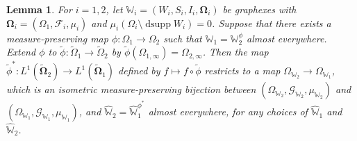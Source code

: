 \documentclass{amsart}
\numberwithin{equation}{section}
\numberwithin{figure}{section}
\newtheorem{lemma}[theorem]{Lemma}
\theoremstyle{definition}
\theoremstyle{remark}
\DeclareMathOperator{\dsupp}{dsupp}
\newcommand{\bOmega}{{\mathbf{\Omega}}}
\newcommand{\wOmega}{{\widetilde{\Omega}}}
\newcommand{\cW}{\mathbb{W}}
\newcommand{\cF}{\mathcal{F}}
\newcommand{\cG}{\mathcal{G}}
\begin{document}
\begin{lemma}
For $i=1,2$, let $\cW_i=(W_i,S_i,I_i,\bOmega_i)$ be graphexes with
$\bOmega_i=(\Omega_1,\cF_i,\mu_i)$ and $\mu_i(\Omega_i\setminus\dsupp
W_i)=0$. Suppose that there exists a measure-preserving map $\phi\colon
\Omega_1 \rightarrow \Omega_2$ such that $\cW_1=\cW_2^\phi$ almost
everywhere. Extend $\phi$ to $\widetilde{\phi}\colon\wOmega_1 \rightarrow
\wOmega_2$ by $\widetilde{\phi}(\Omega_{1,\infty})=\Omega_{2,\infty}$. Then
the map $\widetilde \phi^*\colon L^1(\widetilde{\bOmega}_2) \rightarrow
L^1(\widetilde{\bOmega}_1)$ defined by $f\mapsto f\circ{\widetilde\phi}$
restricts to a map $\Omega_{\cW_2} \rightarrow \Omega_{\cW_1}$, which is an
isometric measure-preserving bijection between
$(\Omega_{\cW_2},\cG_{\cW_2},\mu_{\cW_2})$ and
$(\Omega_{\cW_1},\cG_{\cW_1},\mu_{\cW_1})$, and
$\widehat{\cW}_2=\widehat{\cW}_1^{\phi^*}$ almost everywhere, for any choices
of $\widehat{\cW}_1$ and $\widehat{\cW}_2$.
\end{lemma}
\end{document}
